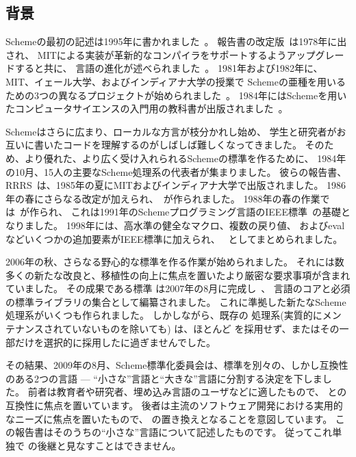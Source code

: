 \subsection*{背景}

\vest Schemeの最初の記述は1995年に書かれました~\cite{Scheme75}。
報告書の改定版~\cite{Scheme78}は1978年に出され、
MITによる実装が革新的なコンパイラをサポートするようアップグレードすると共に、
言語の進化が述べられました~\cite{Rabbit}。
1981年および1982年に、MIT、イェール大学、およびインディアナ大学の授業で
Schemeの亜種を用いるための3つの異なるプロジェクトが始められました~\cite{Rees82,MITScheme,Scheme311}。
1984年にはSchemeを用いたコンピュータサイエンスの入門用の教科書が出版されました~\cite{SICP}。

\vest Schemeはさらに広まり、ローカルな方言が枝分かれし始め、
学生と研究者がお互いに書いたコードを理解するのがしばしば難しくなってきました。
そのため、より優れた、より広く受け入れられるSchemeの標準を作るために、
1984年の10月、15人の主要なScheme処理系の代表者が集まりました。
彼らの報告書、RRRS~\cite{RRRS}は、1985年の夏にMITおよびインディアナ大学で出版されました。
1986年の春にさらなる改定が加えられ、\rthreers~\cite{R3RS}が作られました。
1988年の春の作業では\rfourrs~\cite{R4RS}が作られ、
これは1991年のSchemeプログラミング言語のIEEE標準~\cite{IEEEScheme}の基礎となりました。
1998年には、高水準の健全なマクロ、複数の戻り値、
およびevalなどいくつかの追加要素がIEEE標準に加えられ、
\rfivers~\cite{R5RS}としてまとめられました。


2006年の秋、さらなる野心的な標準を作る作業が始められました。
それには数多くの新たな改良と、移植性の向上に焦点を置いたより厳密な要求事項が含まれていました。
その成果である標準 \rsixrs は2007年の8月に完成し~\cite{R6RS}、
言語のコアと必須の標準ライブラリの集合として編纂されました。
これに準拠した新たなScheme処理系がいくつも作られました。
しかしながら、既存の \rsixrs 処理系(実質的にメンテナンスされていないものを除いても)
は、ほとんど \rsixrs を採用せず、またはその一部だけを選択的に採用したに過ぎませんでした。

その結果、2009年の8月、Scheme標準化委員会は、標準を別々の、しかし互換性のある2つの言語
--- ``小さな''言語と``大きな''言語に分割する決定を下しました。
前者は教育者や研究者、埋め込み言語のユーザなどに適したもので、
\rfivers との互換性に焦点を置いています。
後者は主流のソフトウェア開発における実用的なニーズに焦点を置いたもので、
\rsixrs の置き換えとなることを意図しています。
この報告書はそのうちの``小さな''言語について記述したものです。
従ってこれ単独で \rsixrs の後継と見なすことはできません。



